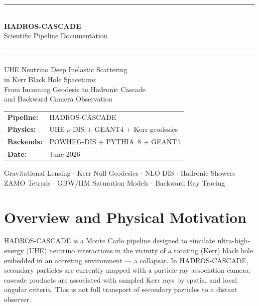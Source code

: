 \documentclass[11pt,a4paper]{article}
\begin{document}
\begin{titlepage}
  \centering
  \vspace*{2cm}
  {\color{darkgreen}\rule{\linewidth}{2pt}}\\[0.8cm]
  {\Huge\bfseries\color{darkgreen} HADROS-CASCADE}\\[0.3cm]
  {\Large\color{brown} Scientific Pipeline Documentation}\\[0.5cm]
  {\color{darkgreen}\rule{\linewidth}{2pt}}\\[1.5cm]

  {\large UHE Neutrino Deep Inelastic Scattering\\
  in Kerr Black Hole Spacetime:\\[0.3cm]
  From Incoming Geodesic to Hadronic Cascade\\
  and Backward Camera Observation}\\[2cm]

  \begin{tabular}{ll}
    \textbf{Pipeline:} & HADROS-CASCADE \\[4pt]
    \textbf{Physics:}  & UHE $\nu$ DIS $+$ GEANT4 $+$ Kerr geodesics \\[4pt]
    \textbf{Backends:} & POWHEG-DIS $+$ PYTHIA~8 $+$ GEANT4 \\[4pt]
    \textbf{Date:}     & June 2026 \\
  \end{tabular}

  \vfill
  {\small\color{codegray}
  Gravitational Lensing $\cdot$ Kerr Null Geodesics $\cdot$ NLO DIS $\cdot$ Hadronic Showers\\
  ZAMO Tetrads $\cdot$ GBW/IIM Saturation Models $\cdot$ Backward Ray Tracing
  }
\end{titlepage}

\tableofcontents
\newpage

\section{Overview and Physical Motivation}

HADROS-CASCADE is a Monte Carlo pipeline designed to simulate ultra-high-energy (UHE) neutrino interactions in the vicinity of a rotating (Kerr) black hole embedded in an accreting environment --- a collapsar. In HADROS-CASCADE, secondary particles are currently mapped with a particle-ray association camera: cascade products are associated with sampled Kerr rays by spatial and local angular criteria. This is not full transport of secondary particles to a distant observer.
\end{document}
